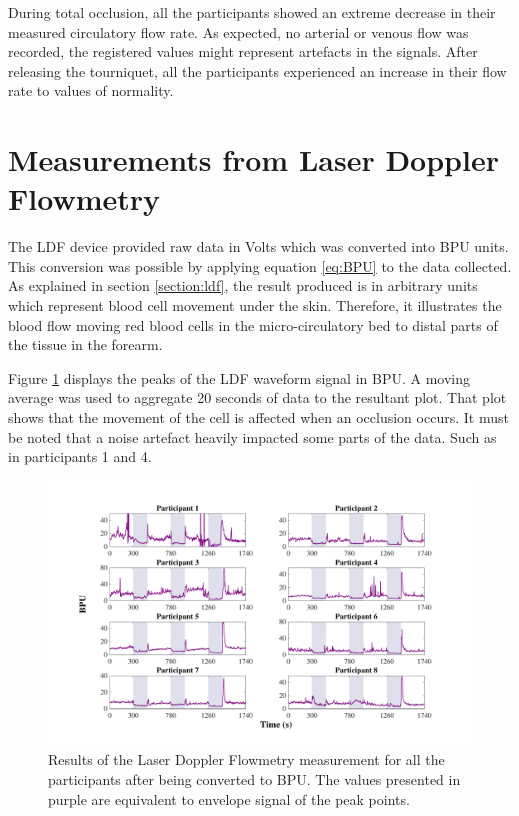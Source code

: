 During total occlusion, all the participants showed an extreme decrease in their measured circulatory flow rate. As expected, no arterial or venous flow was recorded, the registered values might represent artefacts in the signals. After releasing the tourniquet, all the participants experienced an increase in their flow rate to values of normality. 

\section{Measurements from Laser Doppler Flowmetry}
\label{section comparison 2}
The LDF device provided raw data in Volts which was converted into BPU units. This conversion was possible by applying equation \ref{eq:BPU} to the data collected.  As explained in section \ref{section:ldf}, the result produced is in arbitrary units which represent blood cell movement under the skin. Therefore, it illustrates the blood flow moving red blood cells in the micro-circulatory bed to distal parts of the tissue in the forearm.

Figure \ref{fig:LDF flow} displays the peaks of the LDF waveform signal in BPU. A moving average was used to aggregate 20 seconds of data to the resultant plot. That plot shows that the movement of the cell is affected when an occlusion occurs. It must be noted that a noise artefact heavily impacted some parts of the data. Such as in participants 1 and 4.

\begin{figure}[!htb]
	\centering
	\includegraphics[width=\textwidth,height=\textheight,keepaspectratio,trim={2cm 0cm 2cm 0 cm},clip]{figure17}    
	\caption[Results of the LDF in BPU]{Results of the Laser Doppler Flowmetry measurement for all the participants after being converted to BPU. The values presented in purple are equivalent to envelope signal of the peak points.}
	\label{fig:LDF flow}
\end{figure}

